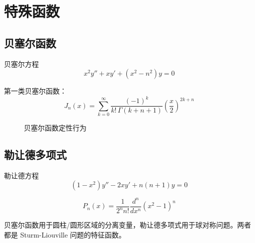 ﻿\chapter{特殊函数}

\section{贝塞尔函数}

\begin{mydefinition}{贝塞尔方程}
\[
x^2y''+xy'+(x^2-n^2)y=0
\]
\end{mydefinition}

\begin{theorem}[贝塞尔函数]
第一类贝塞尔函数：
\[
J_n(x)=\sum_{k=0}^{\infty}\frac{(-1)^k}{k!\,\Gamma(k+n+1)}\left(\frac{x}{2}\right)^{2k+n}
\]
\end{theorem}

\begin{figure}[htbp]
\centering
{}
\caption{贝塞尔函数定性行为}
\end{figure}

\section{勒让德多项式}

\begin{mydefinition}{勒让德方程}
\[
(1-x^2)y''-2xy'+n(n+1)y=0
\]
\end{mydefinition}

\begin{theorem}[勒让德多项式]
\[
P_n(x)=\frac{1}{2^n n!}\frac{d^n}{dx^n}(x^2-1)^n
\]
\end{theorem}

\begin{remark}
贝塞尔函数用于圆柱/圆形区域的分离变量，勒让德多项式用于球对称问题。两者都是 Sturm-Liouville 问题的特征函数。
\end{remark}
